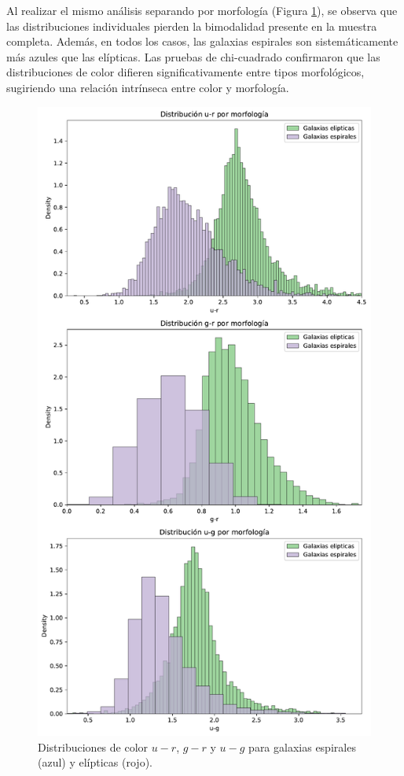 \documentclass[twocolumn]{article}
\begin{document}
Al realizar el mismo análisis separando por morfología (Figura \ref{fig:color_forma}), se observa que las distribuciones individuales pierden la bimodalidad presente en la muestra completa. Además, en todos los casos, las galaxias espirales son sistemáticamente más azules que las elípticas. Las pruebas de chi-cuadrado confirmaron que las distribuciones de color difieren significativamente entre tipos morfológicos, sugiriendo una relación intrínseca entre color y morfología.

\begin{figure}[t]
\includegraphics[width=\linewidth]{colores_morfologia_vertical.pdf}
\caption{Distribuciones de color $u-r$, $g-r$ y $u-g$ para galaxias espirales (azul) y elípticas (rojo).}
\label{fig:color_forma}
\end{figure}
\end{document}
